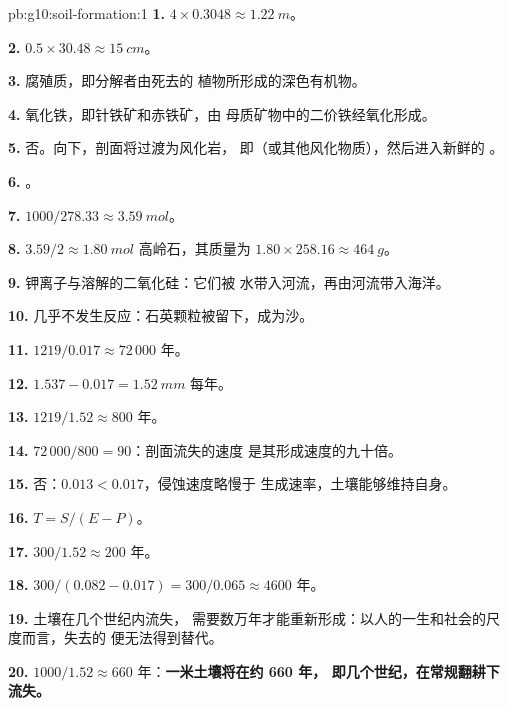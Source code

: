 \begin{solution}{pb:g10:soil-formation:1}
\textbf{1.} $4 \times 0.3048 \approx \qty{1.22}{m}$。

\textbf{2.} $0.5 \times 30.48 \approx \qty{15}{cm}$。

\textbf{3.} 腐殖质，即分解者由死去的
植物所形成的深色有机物。

\textbf{4.} 氧化铁，即针铁矿和赤铁矿，由
母质矿物中的二价铁经氧化形成。

\textbf{5.} 否。向下，剖面将过渡为风化岩，
即（或其他风化物质），然后进入新鲜的
。

\textbf{6.} 。

\textbf{7.} $1000/278.33 \approx \qty{3.59}{mol}$。

\textbf{8.} $3.59/2 \approx \qty{1.80}{mol}$ 高岭石，其质量为 $1.80 \times 258.16
\approx \qty{464}{g}$。

\textbf{9.} 钾离子与溶解的二氧化硅：它们被
水带入河流，再由河流带入海洋。

\textbf{10.} 几乎不发生反应：石英颗粒被留下，成为沙。

\textbf{11.} $1219/0.017 \approx 72\,000$ 年。

\textbf{12.} $1.537 - 0.017 = \qty{1.52}{mm}$ 每年。

\textbf{13.} $1219/1.52 \approx 800$ 年。

\textbf{14.} $72\,000/800 = 90$：剖面流失的速度
是其形成速度的九十倍。

\textbf{15.} 否：$0.013 < 0.017$，侵蚀速度略慢于
生成速率，土壤能够维持自身。

\textbf{16.} $T = S/(E - P)$。

\textbf{17.} $300/1.52 \approx 200$ 年。

\textbf{18.} $300/(0.082 - 0.017) = 300/0.065 \approx 4600$ 年。

\textbf{19.} 土壤在几个世纪内流失，
需要数万年才能重新形成：以人的一生和社会的尺度而言，失去的
便无法得到替代。

\textbf{20.} $1000/1.52 \approx 660$ 年：\textbf{一米土壤将在约 660 年，
即几个世纪，在常规翻耕下流失。}
\end{solution}

